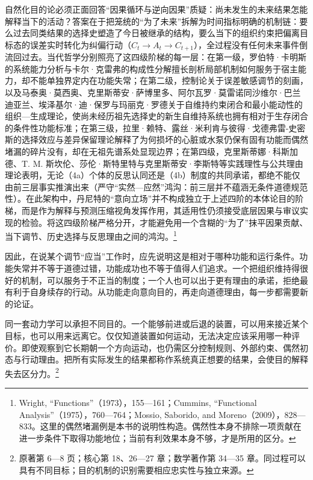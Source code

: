 \documentclass[
  11pt,
  oneside]{book}
\begin{document}
自然化目的论必须正面回答``因果循环与逆向因果''质疑：尚未发生的未来结果怎能解释当下的活动？答案在于把笼统的``为了未来''拆解为时间指标明确的机制链：要么过去同类结果的选择史塑造了今日被继承的结构，要么当下的组织约束把偏离目标态的误差实时转化为纠偏行动（\(C_t\to A_t\to C_{t+1}\)），全过程没有任何未来事件倒流回过去。当代哲学分别照亮了这四级阶梯的每一层：在第一级，罗伯特·卡明斯的系统能力分析与卡尔·克雷弗的构成性分解擅长剖析局部机制如何服务于宿主能力，却不能单独界定内在功能失常；在第二级，控制论关于误差敏感调节的刻画，以及马泰奥·莫西奥、克里斯蒂安·萨博里多、阿尔瓦罗·莫雷诺同沙维尔·巴兰迪亚兰、埃泽基尔·迪·保罗与玛丽克·罗德关于自维持约束闭合和最小能动性的组织---生成理论，使尚未经历祖先选择史的新生自维持系统也拥有相对于生存闭合的条件性功能标准；在第三级，拉里·赖特、露丝·米利肯与彼得·戈德弗雷-史密斯的选择效应与差异保留理论解释了为何损坏的心脏或水泵仍保有固有功能而偶然堵漏的碎片没有，却在无祖先谱系处显现边界；在第四级，克里斯蒂娜·科斯加德、T. M. 斯坎伦、莎伦·斯特里特与克里斯蒂安·李斯特等实践理性与公共理由理论表明，无论（4a）个体的反思认同还是（4b）制度的共同承诺，都绝不能仅由前三层事实推演出来（严守``实然---应然''鸿沟：前三层并不蕴涵无条件道德规范性）。在此架构中，丹尼特的``意向立场''并不构成独立于上述四阶的本体论目的阶梯，而是作为解释与预测压缩视角发挥作用，其适用性仍须接受底层因果与审议实现的检验。将这四级阶梯严格分开，才能避免用一个含糊的``为了''抹平因果贡献、当下调节、历史选择与反思理由之间的鸿沟。\footnote{\hypertarget{ph-note-28}{}Wright, ``Functions''（1973），155---161；Cummins, ``Functional Analysis''（1975），760---764；Mossio, Saborido, and Moreno（2009），828---833。这里的偶然堵漏例是本书的说明性构造。偶然性本身不排除一项贡献在进一步条件下取得功能地位；当前有利效果本身不够，才是所用的区分。}

因此，在说某个调节``应当''工作时，应先说明这是相对于哪种功能和运行条件。功能失常并不等于道德过错，功能成功也不等于值得人们追求。一个把组织维持得很好的机制，可以服务于不正当的制度；一个人也可以出于更有理由的承诺，拒绝最有利于自身续存的行动。从功能走向意向目的，再走向道德理由，每一步都需要新的论证。

同一套动力学可以承担不同目的。一个能够前进或后退的装置，可以用来接近某个目标，也可以用来远离它。仅仅知道装置如何运动，无法决定应该采用哪一种评价。即使观察到它长期朝一个方向运动，也仍需区分控制规则、外部约束、偶然初态与行动理由。把所有实际发生的结果都称作系统真正想要的结果，会使目的解释失去区分力。\footnote{\hypertarget{ph-note-29}{}原著第 6---8 页；核心第 18、26---27 章；数学著作第 34---35 章。同过程可以具有不同目标；目的机制的识别需要相应忠实性与独立来源。}
\end{document}
